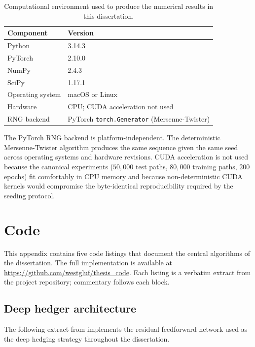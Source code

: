 \documentclass[12pt,a4paper]{article}
\theoremstyle{definition}
\theoremstyle{plain}
\theoremstyle{remark}
\theoremstyle{plain}
\begin{document}
\begin{table}[H]
\centering
\caption{Computational environment used to produce the numerical
results in this dissertation.}
\label{tab:appA_environment}
\begin{tabular}{ll}
\toprule
Component        & Version \\
\midrule
Python           & 3.14.3 \\
PyTorch          & 2.10.0 \\
NumPy            & 2.4.3 \\
SciPy            & 1.17.1 \\
Operating system & macOS or Linux \\
Hardware         & CPU; CUDA acceleration not used \\
RNG backend      & PyTorch \texttt{torch.Generator} (Mersenne-Twister) \\
\bottomrule
\end{tabular}
\end{table}

The PyTorch RNG backend is platform-independent. The deterministic
Mersenne-Twister algorithm produces the same sequence given the same
seed across operating systems and hardware revisions. CUDA acceleration
is not used because the canonical experiments ($50{,}000$ test paths,
$80{,}000$ training paths, $200$ epochs) fit comfortably in CPU memory
and because non-deterministic CUDA kernels would compromise the
byte-identical reproducibility required by the seeding protocol.

\section{Code}
\label{app:code}

This appendix contains five code listings that document the central
algorithms of the dissertation. The full implementation is available at
\url{https://github.com/westgluf/thesis_code}. Each listing is a verbatim
extract from the project repository; commentary follows each block.

\subsection{Deep hedger architecture}
\label{lst:deep_hedger_arch}

The following extract from 
implements the residual feedforward network used as the deep hedging
strategy throughout the dissertation.
\end{document}
